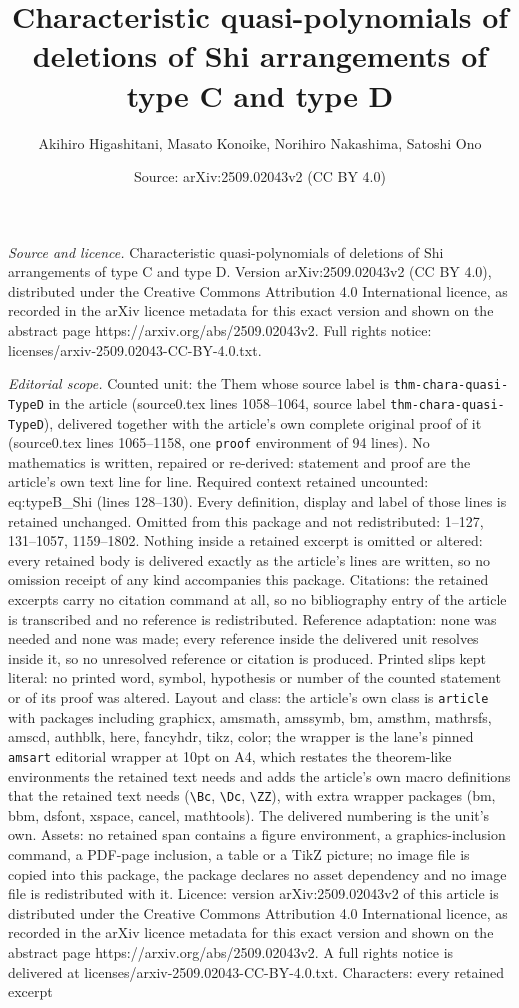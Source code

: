\documentclass[10pt,a4paper]{amsart}
\title[Characteristic quasi-polynomials of deletions of Shi arrange]{Characteristic quasi-polynomials of deletions of Shi arrangements of type C and type D}
\author{Akihiro Higashitani, Masato Konoike, Norihiro Nakashima, Satoshi Ono}
\date{Source: arXiv:2509.02043v2 (CC BY 4.0)}
\begin{document}
\maketitle

\noindent\emph{Source and licence.} Characteristic quasi-polynomials of deletions of Shi arrangements of type C and type D. Version arXiv:2509.02043v2 (CC BY 4.0), distributed under the Creative Commons Attribution 4.0 International licence, as recorded in the arXiv licence metadata for this exact version and shown on the abstract page https://arxiv.org/abs/2509.02043v2. Full rights notice: licenses/arxiv-2509.02043-CC-BY-4.0.txt.\par\smallskip

\noindent\textit{Editorial scope.} Counted unit: the Them whose source label is \texttt{thm-chara-quasi-TypeD} in the article (source0.tex lines 1058--1064, source label \texttt{thm-chara-quasi-TypeD}), delivered together with the article's own complete original proof of it (source0.tex lines 1065--1158, one \texttt{proof} environment of 94 lines). No mathematics is written, repaired or re-derived: statement and proof are the article's own text line for line. Required context retained uncounted: eq:typeB\_Shi (lines 128--130). Every definition, display and label of those lines is retained unchanged. Omitted from this package and not redistributed: 1--127, 131--1057, 1159--1802. Nothing inside a retained excerpt is omitted or altered: every retained body is delivered exactly as the article's lines are written, so no omission receipt of any kind accompanies this package. Citations: the retained excerpts carry no citation command at all, so no bibliography entry of the article is transcribed and no reference is redistributed. Reference adaptation: none was needed and none was made; every reference inside the delivered unit resolves inside it, so no unresolved reference or citation is produced. Printed slips kept literal: no printed word, symbol, hypothesis or number of the counted statement or of its proof was altered. Layout and class: the article's own class is \texttt{article} with packages including graphicx, amsmath, amssymb, bm, amsthm, mathrsfs, amscd, authblk, here, fancyhdr, tikz, color; the wrapper is the lane's pinned \texttt{amsart} editorial wrapper at 10pt on A4, which restates the theorem-like environments the retained text needs and adds the article's own macro definitions that the retained text needs (\texttt{\textbackslash Bc}, \texttt{\textbackslash Dc}, \texttt{\textbackslash ZZ}), with extra wrapper packages (bm, bbm, dsfont, xspace, cancel, mathtools). The delivered numbering is the unit's own. Assets: no retained span contains a figure environment, a graphics-inclusion command, a PDF-page inclusion, a table or a TikZ picture; no image file is copied into this package, the package declares no asset dependency and no image file is redistributed with it. Licence: version arXiv:2509.02043v2 of this article is distributed under the Creative Commons Attribution 4.0 International licence, as recorded in the arXiv licence metadata for this exact version and shown on the abstract page https://arxiv.org/abs/2509.02043v2. A full rights notice is delivered at licenses/arxiv-2509.02043-CC-BY-4.0.txt. Characters: every retained excerpt 
\end{document}
